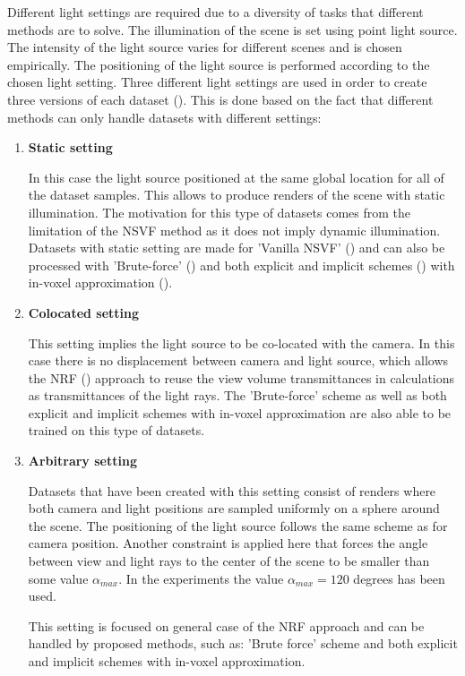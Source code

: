 Different light settings are required due to a diversity of tasks that different methods are to solve.
The illumination of the scene is set using point light source.
The intensity of the light source varies for different scenes and is chosen empirically.
The positioning of the light source is performed according to the chosen light setting.
Three different light settings are used in order to create three versions of each dataset ().
This is done based on the fact that different methods can only handle datasets with different settings:
\begin{enumerate}
    \item \textbf{Static setting}
    
    In this case the light source positioned at the same global location for all of the dataset samples.
    This allows to produce renders of the scene with static illumination.
    The motivation for this type of datasets comes from the limitation of the NSVF method
    as it does not imply dynamic illumination.
    Datasets with static setting are made for 'Vanilla NSVF' (\cite{liu2021neural})
    and can also be processed with 'Brute-force' ()
    and both explicit and implicit schemes ()
    with in-voxel approximation ().
    
    \item \textbf{Colocated setting}
    
    This setting implies the light source to be co-located with the camera.
    In this case there is no displacement between camera and light source,
    which allows the NRF (\cite{bi2020neural}) approach to reuse the view volume transmittances
    in calculations as transmittances of the light rays.
    The 'Brute-force' scheme as well as both explicit and implicit schemes
    with in-voxel approximation are also able to be trained on this type of datasets.
    
    \item \textbf{Arbitrary setting}
    
    Datasets that have been created with this setting consist of renders
    where both camera and light positions are sampled uniformly on a sphere around the scene.
    The positioning of the light source follows the same scheme as for camera position.
    Another constraint is applied here that forces the angle
    between view and light rays to the center of the scene to be smaller
    than some value $\alpha_{max}$.
    In the experiments the value $\alpha_{max} = 120$ degrees has been used.
    
    This setting is focused on general case of the NRF approach
    and can be handled by proposed methods, such as: 'Brute force' scheme
    and both explicit and implicit schemes with in-voxel approximation.
\end{enumerate}

